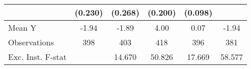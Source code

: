 {\begin{tabular}{l*{5}{c}}
            &     (0.230)         &     (0.268)         &     (0.200)         &     (0.098)         &                     \\
\midrule
Mean Y      &       -1.94         &       -1.89         &        4.00         &        0.07         &       -1.94         \\
Observations&         398         &         403         &         418         &         396         &         381         \\
Exc. Inst. F-stat&                     &      14.670         &      50.826         &      17.669         &      58.577         \\
\bottomrule
\end{tabular}
}
